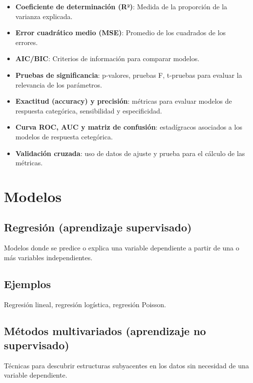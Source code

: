 \documentclass[
  letterpaper,
  DIV=11,
  numbers=noendperiod]{scrreprt}
\providecommand{\tightlist}{%
  \setlength{\itemsep}{0pt}\setlength{\parskip}{0pt}}\usepackage{longtable,booktabs,array}
\begin{document}
\begin{itemize}
\tightlist
\item
  \textbf{Coeficiente de determinación (R²)}: Medida de la proporción de
  la varianza explicada.
\item
  \textbf{Error cuadrático medio (MSE)}: Promedio de los cuadrados de
  los errores.
\item
  \textbf{AIC/BIC}: Criterios de información para comparar modelos.
\item
  \textbf{Pruebas de significancia}: p-valores, pruebas F, t-pruebas
  para evaluar la relevancia de los parámetros.
\item
  \textbf{Exactitud (accuracy) y precisión}: métricas para evaluar
  modelos de respuesta categórica, sensibilidad y especificidad.
\item
  \textbf{Curva ROC, AUC y matriz de confusión}: estadígracos asociados
  a los modelos de respuesta cetegórica.
\item
  \textbf{Validación cruzada}: uso de datos de ajuste y prueba para el
  cálculo de las métricas.
\end{itemize}

\section{Modelos}\label{modelos}

\subsection{Regresión (aprendizaje
supervisado)}\label{regresiuxf3n-aprendizaje-supervisado}

Modelos donde se predice o explica una variable dependiente a partir de
una o más variables independientes.

\subsection{Ejemplos}\label{ejemplos}

Regresión lineal, regresión logística, regresión Poisson.

\subsection{Métodos multivariados (aprendizaje no
supervisado)}\label{muxe9todos-multivariados-aprendizaje-no-supervisado}

Técnicas para descubrir estructuras subyacentes en los datos sin
necesidad de una variable dependiente.
\end{document}
